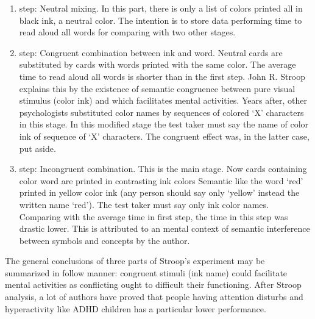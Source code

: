 \begin{enumerate}

\item step: Neutral mixing. In this part, there is only a list of colors printed all in black ink, a neutral color. The intention is to store data performing time to read aloud all words for comparing with two other stages.



\item step: Congruent combination between ink and word. Neutral cards are substituted by cards with words printed with the same color. The average time to read aloud all words is shorter than in the first step. John R. Stroop explains this by the existence of semantic congruence between pure visual stimulus (color ink) and which facilitates mental activities. Years after, other psychologists substituted color names by sequences of colored `X' characters in this stage. In this modified stage the test taker must say the name of color ink of sequence of `X' characters. The congruent effect was, in the latter case, put aside.



\item step: Incongruent combination. This is the main stage. Now cards containing color word are printed in contrasting ink colors Semantic like the word `red' printed in yellow color ink (any person should say only `yellow' instead the written name `red'). The test taker must say only ink color names. Comparing with the average time in first step, the time in this step was drastic lower. This is attributed to an mental context of semantic interference between symbols and concepts by the author.



\end{enumerate}



The general conclusions of three parts of Stroop's experiment may be summarized in follow manner: congruent stimuli (ink name) could facilitate mental activities as conflicting ought to difficult their functioning. After Stroop analysis, a lot of authors have proved that people having attention disturbs and hyperactivity like ADHD children has a particular lower performance.



